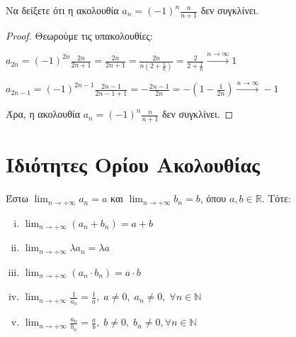 \begin{example}
  Να δείξετε ότι η ακολουθία $ a_{n} = (-1)^{n}\frac{n}{n+1} $ δεν συγκλίνει. 
\end{example}

\begin{proof}
\item {}
  Θεωρούμε τις υπακολουθίες:
  \begin{myitemize}[labelindent=1em]
    \item $ a_{2n} = (-1)^{2n} \frac{2n}{2n+1} = \frac{2n}{2n+1} = \frac{2n}{n(2+
      \frac{1}{n})} = \frac{2}{2+ \frac{1}{n}} \xrightarrow{n \to \infty} 1 $
    \item $ a_{2n-1} = (-1)^{2n-1} \frac{2n-1}{2n-1+1} = -\frac{2n-1}{2n} = 
      -\left(1 - \frac{1}{2n}\right) \xrightarrow{n \to \infty} -1  $
  \end{myitemize}
  Άρα, η ακολουθία $ a_{n}= (-1)^{n} \frac{n}{n+1} $ δεν συγκλίνει.
\end{proof}



\section{Ιδιότητες Ορίου Ακολουθίας}

\begin{mybox3}
  \begin{prop}
    Έστω $ \lim_{n \to +\infty} a_{n} = a$ και $ \lim_{n \to +\infty} 
    b_{n} = b $, όπου $ a,b \in \mathbb{R} $. Τότε:
    \begin{enumerate}[i)]
      \item $ \lim_{n \to +\infty} (a_{n} + b_{n}) = a+b $
      \item $ \lim_{n \to +\infty} \lambda a_{n}= \lambda a $
      \item $ \lim_{n \to +\infty} (a_{n}\cdot b_{n}) = a\cdot b $
      \item $ \lim_{n \to +\infty} \frac{1}{a_{n}} = \frac{1}{a},
        \; a \neq 0, \; a_{n} \neq 0, \; \forall n \in \mathbb{N}  $
      \item $ \lim_{n \to +\infty} \frac{a_{n}}{b_{n}} = \frac{a}{b},
         \; b \neq 0, \; b_{n} \neq 0, \forall n \in \mathbb{N} $
    \end{enumerate}
  \end{prop}
\end{mybox3}

